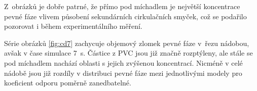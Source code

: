 \newpage
\noindent Z~obrázků je dobře patrné, že přímo pod míchadlem je největší koncentrace pevné fáze vlivem působení sekundárních cirkulačních smyček, což se podařilo pozorovat i během experimentálního měření.

Série obrázků \ref{fig:cd7} zachycuje objemový zlomek pevné fáze v~řezu nádobou, avšak v čase simulace \SI{7}{\second}. Částice z PVC jsou již značně rozptýleny, ale stále se pod míchadlem nachází oblasti s jejich zvýšenou koncentrací. Nicméně v celé nádobě jsou již rozdíly v distribuci pevné fáze mezi jednotlivými modely pro koeficient odporu poměrně zanedbatelné.

\begin{figure}[h!]
 \centering
  \qquad             

\end{figure}
